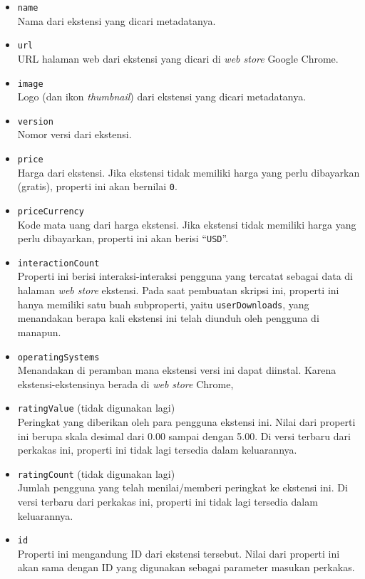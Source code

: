 \begin{itemize}
	\item \verb|name|\\
	Nama dari ekstensi yang dicari metadatanya.
	\item \verb|url|\\
	URL halaman web dari ekstensi yang dicari di \textit{web store} Google Chrome.
	\item \verb|image|\\
	Logo (dan ikon \textit{thumbnail}) dari ekstensi yang dicari metadatanya.
	\item \verb|version|\\
	Nomor versi dari ekstensi.
	\item \verb|price|\\
	Harga dari ekstensi. Jika ekstensi tidak memiliki harga yang perlu dibayarkan (gratis), properti ini akan bernilai \verb|0|.
	\item \verb|priceCurrency|\\
	Kode mata uang dari harga ekstensi. Jika ekstensi tidak memiliki harga yang perlu dibayarkan, properti ini akan berisi ``\verb|USD|''.
	\item \verb|interactionCount|\\
	Properti ini berisi interaksi-interaksi pengguna yang tercatat sebagai data di halaman \textit{web store} ekstensi. Pada saat pembuatan skripsi ini, properti ini hanya memiliki satu buah subproperti, yaitu \verb|userDownloads|, yang menandakan berapa kali ekstensi ini telah diunduh oleh pengguna di manapun.
	\item \verb|operatingSystems|\\
	Menandakan di peramban mana ekstensi versi ini dapat diinstal. Karena ekstensi-ekstensinya berada di \textit{web store} Chrome,
	\item \verb|ratingValue| (tidak digunakan lagi)\\
	Peringkat yang diberikan oleh para pengguna ekstensi ini. Nilai dari properti ini berupa skala desimal dari 0.00 sampai dengan 5.00. Di versi terbaru dari perkakas ini, properti ini tidak lagi tersedia dalam keluarannya.
	\item \verb|ratingCount| (tidak digunakan lagi)\\
	Jumlah pengguna yang telah menilai/memberi peringkat ke ekstensi ini. Di versi terbaru dari perkakas ini, properti ini tidak lagi tersedia dalam keluarannya.
	\item \verb|id|\\
	Properti ini mengandung ID dari ekstensi tersebut. Nilai dari properti ini akan sama dengan ID yang digunakan sebagai parameter masukan perkakas.
\end{itemize}
\vfill
